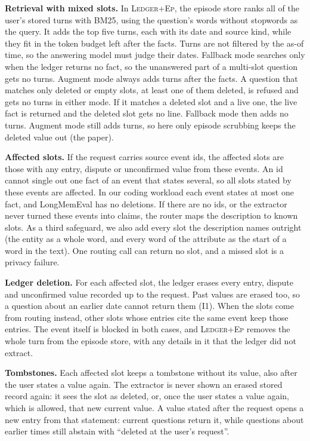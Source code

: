 \documentclass[10pt,conference]{IEEEtran}
\newcommand{\hyb}{\textsc{Ledger+Ep}}
\begin{document}
\textbf{Retrieval with mixed slots.} In \hyb{}, the episode store ranks all of the user's stored turns with BM25, using the question's words without stopwords as the query. It adds the top five turns, each with its date and source kind, while they fit in the token budget left after the facts. Turns are not filtered by the as-of time, so the answering model must judge their dates. Fallback mode searches only when the ledger returns no fact, so the unanswered part of a multi-slot question gets no turns. Augment mode always adds turns after the facts. A question that matches only deleted or empty slots, at least one of them deleted, is refused and gets no turns in either mode. If it matches a deleted slot and a live one, the live fact is returned and the deleted slot gets no line. Fallback mode then adds no turns. Augment mode still adds turns, so here only episode scrubbing keeps the deleted value out (the paper).

\textbf{Affected slots.} If the request carries source event ids, the affected slots are those with any entry, dispute or unconfirmed value from these events. An id cannot single out one fact of an event that states several, so all slots stated by these events are affected. In our coding workload each event states at most one fact, and LongMemEval has no deletions. If there are no ids, or the extractor never turned these events into claims, the router maps the description to known slots. As a third safeguard, we also add every slot the description names outright (the entity as a whole word, and every word of the attribute as the start of a word in the text). One routing call can return no slot, and a missed slot is a privacy failure.

\textbf{Ledger deletion.} For each affected slot, the ledger erases every entry, dispute and unconfirmed value recorded up to the request. Past values are erased too, so a question about an earlier date cannot return them (I1). When the slots come from routing instead, other slots whose entries cite the same event keep those entries. The event itself is blocked in both cases, and \hyb{} removes the whole turn from the episode store, with any details in it that the ledger did not extract.

\textbf{Tombstones.} Each affected slot keeps a tombstone without its value, also after the user states a value again. The extractor is never shown an erased stored record again: it sees the slot as deleted, or, once the user states a value again, which is allowed, that new current value. A value stated after the request opens a new entry from that statement: current questions return it, while questions about earlier times still abstain with ``deleted at the user's request''.
\end{document}
